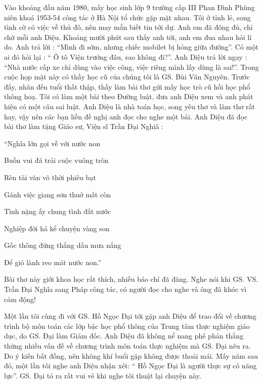 Vào khoảng đầu năm 1980, mấy học sinh lớp 9 trường cấp III Phan Đình Phùng niên khoá 1953-54 công tác ở Hà Nội tổ chức gặp mặt nhau. Tôi ở tỉnh lẻ, song tình cờ có việc về thủ đô, nên may mắn biết tin tới dự. Anh em đã đông đủ, chỉ chờ mỗi anh Diệu. Khoảng mười phút sau thấy anh tới, anh em đua nhau hỏi lí do. Anh trả lời : “Mình đi sớm, nhưng chiếc mobilet bị hỏng giữa đường”. Có một ai đó hỏi lại : “ Ô tô Viện trưởng đâu, sao không đi?”. Anh Diệu trả lời ngay : “Nhà nước cấp xe chỉ dùng vào việc công, việc riêng mình lấy dùng là sai!”. Trong cuộc họp mặt này có thầy học cũ của chúng tôi là GS. Bùi Văn Nguyên. Trước đấy, nhân đến tuổi thất thập, thầy làm bài thơ gửi mấy học trò cũ hồi học phổ thông hoạ. Tôi có làm một bài theo Đường luật, đưa anh Diệu xem và anh phát hiện có một câu sai luật. Anh Diệu là nhà toán học, song yêu thơ và làm thơ rất hay, vậy nên các bạn liền đề nghị anh đọc cho nghe một bài. Anh Diệu đã đọc bài thơ làm tặng Giáo sư, Viện sĩ Trần Đại Nghiã :

                                           “Nghĩa lớn gọi về với nước non

Buồn vui đã trải cuộc vuông tròn

Rèn tài văn võ thời phiêu bạt

Gánh việc giang sơn thuở mất còn

Tình nặng ấy chung tình đất nước

Nghiệp đời há kể chuyện vàng son

Gốc thông đứng thẳng dầu mưa nắng

Để gió lành reo mát nước non.”

Bài thơ này giới khoa học rất thích, nhiều báo chí đã đăng. Nghe nói khi GS. VS. Trần Đại Nghĩa sang Pháp công tác, có người  đọc cho nghe và ông đã khóc vì cảm động!

Một lần tôi cùng đi với GS. Hồ Ngọc Đại tới gặp anh Diệu để trao đổi về chương trình bộ môn toán các lớp bậc học phổ thông của Trung tâm thực nghiệm giáo dục, do GS. Đại làm Giám đốc. Anh Diệu đã không nể nang phê phán thẳng thừng nhiều vấn đề về chương trình môn toán thực nghiệm mà GS. Đại nêu ra. Do ý kiến bất đồng, nên không khí buổi gặp không được thoải mái. Mấy năm sau đó, một lần tôi nghe anh Diệu nhận xét: “ Hồ Ngọc Đại là người thực sự có năng lực”. GS. Đại tỏ ra rất vui vẻ khi nghe tôi thuật lại chuyện này.

